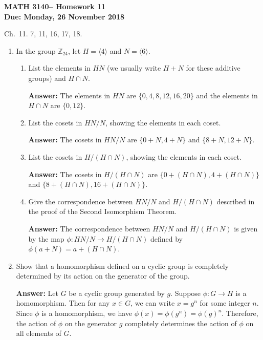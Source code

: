\documentclass[12pt,reqno]{amsart}
\newcommand{\<}{\ensuremath{\langle}}
\renewcommand{\>}{\ensuremath{\rangle}}
\newcommand{\subject}{MATH\xspace}
\newcommand{\coursenumber}{3140\xspace}
\newcommand{\exercises}{Ch.~11. 7, 11, 16, 17, 18.}
\newcommand{\due}[1]{{\bf Due:} #1}
\newcommand{\hwheading}{\textbf{\subject \coursenumber -- Homework 11 \\ \due{Monday, 26 November 2018}}}
\begin{document}
\thispagestyle{empty}

\noindent \hwheading

 \exercises 

\bigskip

\begin{enumerate}
\item[{\bf 11.7}] 
In the group ${\mathbb Z}_{24}$, let $H = \langle 4 \rangle$ and $N =
\langle 6 \rangle$. 
\begin{enumerate}
 
 \item
List the elements in $HN$ (we usually write $H + N$ for these additive
groups) and $H \cap N$. 

\textbf{Answer:} The elements in $HN$ are $\{0, 4, 8, 12, 16, 20\}$ and the elements in $H \cap N$ are $\{0, 12\}$.
 
 \item
List the cosets in $HN/N$, showing the elements in each coset.

\textbf{Answer:} The cosets in $HN/N$ are $\{0 + N, 4 + N\}$ and $\{8 + N, 12 + N\}$.

 
 \item
List the cosets in $H/(H \cap N)$, showing the elements in each coset. 

\textbf{Answer:} The cosets in $H/(H \cap N)$ are $\{0 + (H \cap N), 4 + (H \cap N)\}$ and $\{8 + (H \cap N), 16 + (H \cap N)\}$.

 
 \item
Give the correspondence between $HN/N$ and $H/(H \cap N)$ described in
the proof of the Second Isomorphism Theorem. 

\textbf{Answer:} The correspondence between $HN/N$ and $H/(H \cap N)$ is given by the map $\phi: HN/N \to H/(H \cap N)$ defined by $\phi(a + N) = a + (H \cap N)$.

\end{enumerate}


\bigskip

\item[{\bf 11.11}]
Show that a homomorphism defined on a cyclic group is completely
determined by its action on the generator of the group.

\textbf{Answer:} Let $G$ be a cyclic group generated by $g$. Suppose $\phi: G \to H$ is a homomorphism. Then for any $x \in G$, we can write $x = g^n$ for some integer $n$. Since $\phi$ is a homomorphism, we have $\phi(x) = \phi(g^n) = \phi(g)^n$. Therefore, the action of $\phi$ on the generator $g$ completely determines the action of $\phi$ on all elements of $G$.


\end{enumerate}
\end{document}
